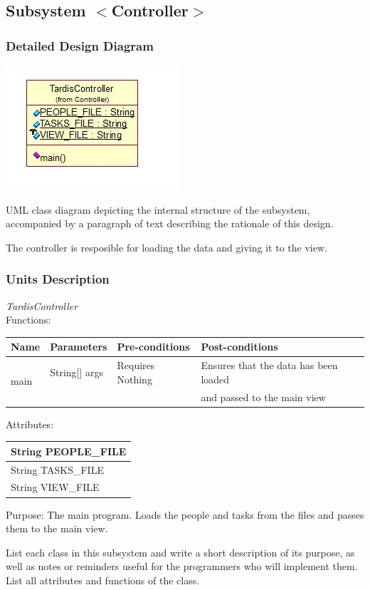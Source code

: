 \subsection{Subsystem $<$Controller$>$}

\subsubsection{Detailed Design Diagram}
\includegraphics{subsystems/diagrams/controller_class_diagram.jpg}

UML class diagram depicting the internal structure of the subsystem,
accompanied by a paragraph of text describing the rationale of this design.

The controller is resposible for loading the data and giving it to the view.

\subsubsection{Units Description}

\emph{TardisController}\\
Functions:\\
\begin{tabular}{| l | l | l | l |}
\hline
Name & Parameters & Pre-conditions & Post-conditions\\
\hline
\multirow{2}{*}{main} & String[] args & Requires Nothing & Ensures that the data has been loaded\\ 
			 &  & & and passed to the main view
\\
\hline
\end{tabular}

Attributes:\\
\begin{tabular}{| l |}
\hline
String PEOPLE\_FILE\\
\hline
String TASKS\_FILE\\
\hline
String VIEW\_FILE\\
\hline 
\end{tabular}

Purpose: The main program. Loads the people and tasks from the files and passes them to the main view.

List each class in this subsystem and write a short description of its purpose,
as well as notes or reminders useful for the programmers who will implement them.
List all attributes and functions of the class.